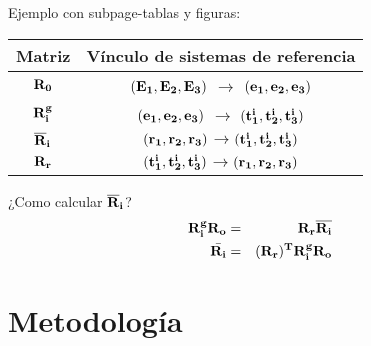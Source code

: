 \documentclass[
  aspectratio=169,
]{beamer}
\begin{document}
\begin{small}
\begin{frame}{Ejemplo con subpage-tablas y figuras:}{}
	\begin{minipage}[t]{0.5\linewidth}
		\begin{figure}[htbp]
			\centering
			\def\svgwidth{60mm}
			
		\end{figure}
	\end{minipage}\hfill
	\begin{minipage}[t]{0.5\linewidth}
		\begin{table}[htbp]
			\begin{tabular}{|c|c|}
				\hline
				Matriz & Vínculo de sistemas de referencia \\
				\hline \hline
				$\bf{R}_0$ &$(\bf{E_1},\bf{E_2},\bf{E_3})$ $\rightarrow$
				$(\bf{e_1},\bf{e_2},\bf{e_3})$   \\ \hline
				$\bf{R}_i^g$ & $(\bf{e_1},\bf{e_2},\bf{e_3})$ $\rightarrow$
				$(\bf{t_1^i},\bf{t_2^i},\bf{t_3^i})$ \\ \hline
				$\bf{\overline{R}}_i$ &
				$(\bf{r_1},\bf{r_2},\bf{r_3})$$\rightarrow$$(\bf{t_1^i},\bf{t_2^i},\bf{t_3^i})$
				\\ \hline
				$\bf{R}_r$ &
				$(\bf{t_1^i},\bf{t_2^i},\bf{t_3^i})$$\rightarrow$$(\bf{r_1},\bf{r_2},\bf{r_3})$ \\
				\hline
			\end{tabular}
		\end{table}
		\begin{block}{¿Como calcular $\bf{\overline{R}}_i$? }
			\begin{eqnarray}
			\bf{R_i^g}\bf{R_o}&=& \bf{R_r}\overline{\bf{R_i}}\\
			\bar{\bf{R_i}}&=&(\bf{R_r})^T\bf{R_i^g}\bf{R_o}
			\end{eqnarray}
		\end{block}
	\end{minipage}	
\end{frame}



\section[Metodología]{Metodología}


\end{small}
\end{document}
